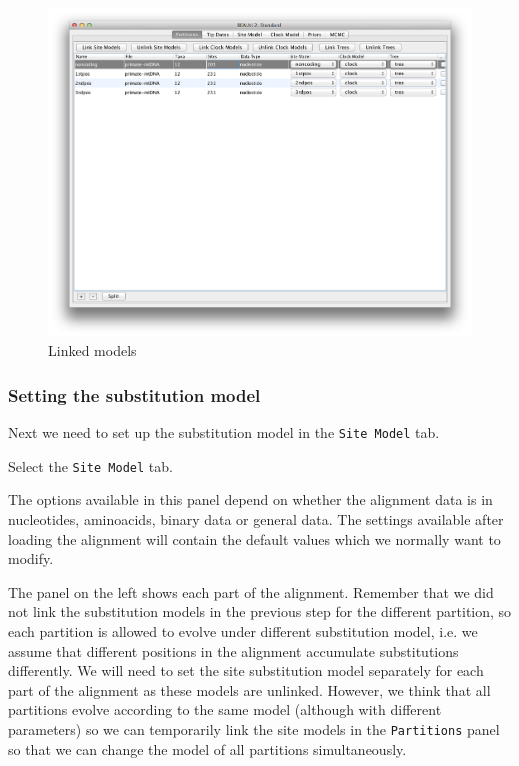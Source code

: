 \documentclass[11pt]{article}
\begin{document}
\begin{figure}[H]
\centering
\includegraphics[width=5in]{figures/link.png}
\caption{\small Linked models}
\label{fig:link}
\end{figure}

\subsubsection{Setting the substitution model}

Next we need to set up the substitution model in the \texttt{Site Model} tab.

\begin{framed}
Select the \texttt{Site Model} tab.
\end{framed}

The options available in this panel depend on whether the alignment data is in nucleotides, aminoacids, binary data or general data. The settings available after loading the alignment will contain the default values which we normally want to modify.

The panel on the left shows each part of the alignment. Remember that we did not link the substitution models in the previous step for the different partition, so each partition is allowed to evolve under different substitution model, i.e. we assume that different positions in the alignment accumulate substitutions differently. We will need to set the site substitution model separately for each part of the alignment as these models are unlinked. However, we think that all partitions evolve according to the same model (although with different parameters) so we can temporarily link the site models in the \texttt{Partitions} panel so that we can change the model of all partitions simultaneously. 
\end{document}
